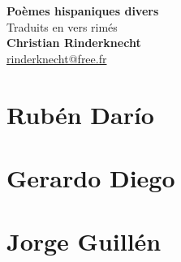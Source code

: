 \documentclass[11pt,a4paper]{book}
\begin{document}
\thispagestyle{empty}

\vspace*{70mm}

\begin{center}
{\Huge\textbf{Poèmes hispaniques divers}} \\
\bigskip
Traduits en vers rimés \\
\medskip
\textbf{Christian Rinderknecht}\\
\url{rinderknecht@free.fr}
\end{center}


\part{Rubén Darío}




%


\part{Gerardo Diego}





\part{Jorge Guillén}



%

\tableofcontents
\end{document}
